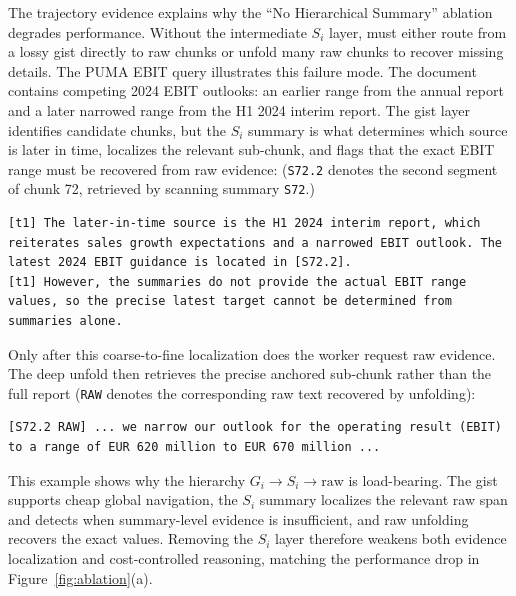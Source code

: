 The trajectory evidence explains why the ``No Hierarchical Summary'' ablation degrades performance. Without the intermediate $S_i$ layer, \toolName{} must either route from a lossy gist directly to raw chunks or unfold many raw chunks to recover missing details. The PUMA EBIT query illustrates this failure mode. The document contains competing 2024 EBIT outlooks: an earlier range from the annual report and a later narrowed range from the H1 2024 interim report. The gist layer identifies candidate chunks, but the $S_i$ summary is what determines which source is later in time, localizes the relevant sub-chunk, and flags that the exact EBIT range must be recovered from raw evidence: (\texttt{S72.2} denotes the second segment of chunk 72, retrieved by scanning summary \texttt{S72}.)
\begin{lstlisting}[style=gist]
[t1] The later-in-time source is the H1 2024 interim report, which reiterates sales growth expectations and a narrowed EBIT outlook. The latest 2024 EBIT guidance is located in [S72.2].
[t1] However, the summaries do not provide the actual EBIT range values, so the precise latest target cannot be determined from summaries alone.
\end{lstlisting}

Only after this coarse-to-fine localization does the worker request raw evidence. The deep unfold then retrieves the precise anchored sub-chunk rather than the full report (\texttt{RAW} denotes the corresponding raw text recovered by unfolding):
\begin{lstlisting}[style=gist]
[S72.2 RAW] ... we narrow our outlook for the operating result (EBIT) to a range of EUR 620 million to EUR 670 million ...
\end{lstlisting}

This example shows why the hierarchy $G_i \rightarrow S_i \rightarrow \text{raw}$ is load-bearing. The gist supports cheap global navigation, the $S_i$ summary localizes the relevant raw span and detects when summary-level evidence is insufficient, and raw unfolding recovers the exact values. Removing the $S_i$ layer therefore weakens both evidence localization and cost-controlled reasoning, matching the performance drop in Figure~\ref{fig:ablation}(a).


